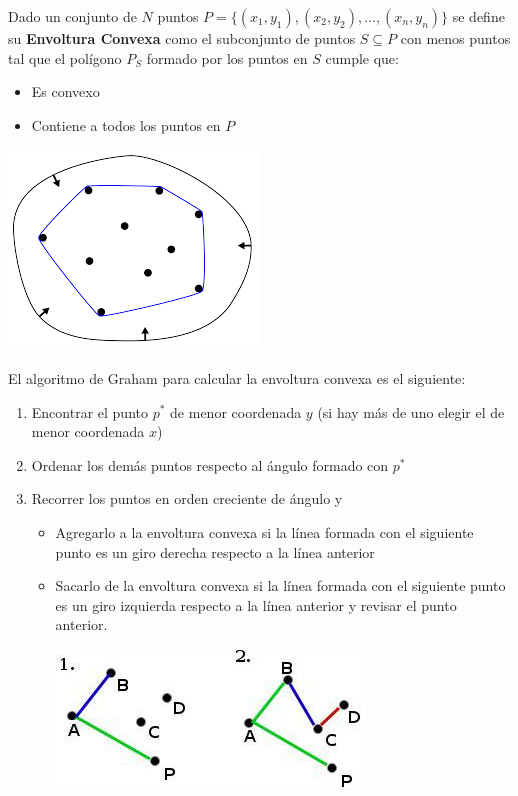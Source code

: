 \documentclass[dcc,uchile]{fcfmcourse}
\begin{document}
\begin{problems}
Dado un conjunto de $N$ puntos $P = \{(x_{1}, y_{1}), (x_{2}, y_{2}), \ldots, (x_{n}, y_{n})\}$ se define su \textbf{Envoltura Convexa} como el subconjunto de puntos $S \subseteq P$ con menos puntos tal que el polígono $P_{S}$ formado por los puntos en $S$ cumple que:
\begin{itemize}
    \item Es convexo
    \item Contiene a todos los puntos en $P$
\end{itemize}

\begin{center}
    \includegraphics[scale=0.5]{imagenes/convexHull.png}
\end{center}    
El algoritmo de Graham para calcular la envoltura convexa es el siguiente:
\begin{enumerate}[1.]
    \item Encontrar el punto $p^*$ de menor coordenada $y$ (si hay más de uno elegir el de menor coordenada $x$)
    \item Ordenar los demás puntos respecto al ángulo formado con $p^*$
    \item Recorrer los puntos en orden creciente de ángulo y
    \begin{itemize}
        \item Agregarlo a la envoltura convexa si la línea formada con el siguiente punto es un giro derecha respecto a la línea anterior\\
        \item Sacarlo de la envoltura convexa si la línea formada con el siguiente punto es un giro izquierda respecto a la línea anterior y revisar el punto anterior.\\
        \begin{center}
        \includegraphics[scale=0.5]{imagenes/result.jpg}

\end{center}
\end{itemize}
\end{enumerate}
\end{problems}
\end{document}
